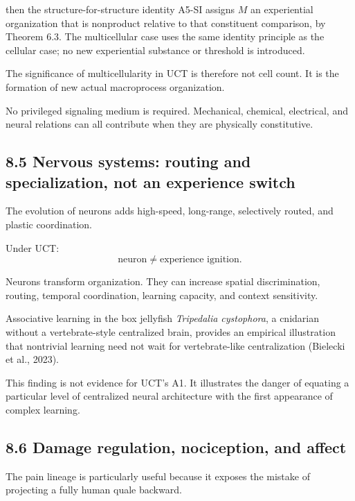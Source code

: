 \documentclass[
  11pt,
  a4paper,
]{article}
\begin{document}
then the structure-for-structure identity A5-SI assigns \(M\) an
experiential organization that is nonproduct relative to that
constituent comparison, by Theorem 6.3. The multicellular case uses the
same identity principle as the cellular case; no new experiential
substance or threshold is introduced.

The significance of multicellularity in UCT is therefore not cell count.
It is the formation of new actual macroprocess organization.

No privileged signaling medium is required. Mechanical, chemical,
electrical, and neural relations can all contribute when they are
physically constitutive.

\hypertarget{nervous-systems-routing-and-specialization-not-an-experience-switch}{%
\subsection{8.5 Nervous systems: routing and specialization, not an
experience
switch}\label{nervous-systems-routing-and-specialization-not-an-experience-switch}}

The evolution of neurons adds high-speed, long-range, selectively
routed, and plastic coordination.

Under UCT:
\nopagebreak[4]
\[
\boxed{
\text{neuron}
\neq
\text{experience ignition}.
}
\]

Neurons transform organization. They can increase spatial
discrimination, routing, temporal coordination, learning capacity, and
context sensitivity.

Associative learning in the box jellyfish \emph{Tripedalia cystophora},
a cnidarian without a vertebrate-style centralized brain, provides an
empirical illustration that nontrivial learning need not wait for
vertebrate-like centralization (Bielecki et al., 2023).

This finding is not evidence for UCT's A1. It illustrates the danger of
equating a particular level of centralized neural architecture with the
first appearance of complex learning.

\hypertarget{damage-regulation-nociception-and-affect}{%
\subsection{8.6 Damage regulation, nociception, and
affect}\label{damage-regulation-nociception-and-affect}}

The pain lineage is particularly useful because it exposes the mistake
of projecting a fully human quale backward.
\end{document}
